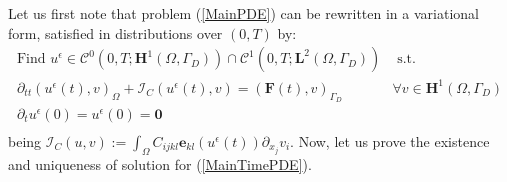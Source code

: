 Let us first note that problem (\ref{MainPDE}) can be rewritten in a variational form, satisfied in distributions over $(0,T)$ by: 
\begin{equation}
    \label{MainTimePDE}
    \begin{array}{cc}
        \text{Find } u^{\epsilon} \in \mathcal{C}^0 (0,T;\mathbf{H}^1(\Omega,\Gamma_D)) \cap \mathcal{C}^1(0,T;\mathbf{L}^2(\Omega,\Gamma_D)) & \text{ s.t. }\\
        \partial_{tt} (u^{\epsilon}(t),v)_{\Omega} + \mathcal{I}_{C}(u^{\epsilon}(t),v) = (\mathbf{F}(t),v)_{\Gamma_D}&  \forall v \in \mathbf{H}^1(\Omega,\Gamma_D) \\
        \partial_{t} u^{\epsilon}(0) = u^{\epsilon}(0) = \mathbf{0} & \\
    \end{array}
\end{equation}
being $\mathcal{I}_{C}(u,v) := \int_{\Omega} C_{ijkl}\mathbf{e}_{kl}(u^{\epsilon}(t)) \partial_{x_j} v_i$.
Now, let us prove the existence and uniqueness of solution for (\ref{MainTimePDE}).
